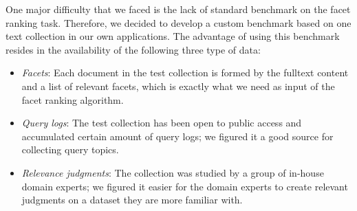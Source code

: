 
One major difficulty that we faced is the lack of standard benchmark on the
facet ranking task.  Therefore, we decided to develop a custom benchmark based
on one text collection in our own applications.  The advantage of using this
benchmark resides in the availability of the following three type of data:
\begin{itemize} \item \emph{Facets}: Each document in the test collection is
formed by the fulltext content and a list of relevant facets, which is exactly
what we need as input of the facet ranking algorithm.  \item \emph{Query logs}:
The test collection has been open to public access and accumulated certain
amount of query logs; we figured it a good source for collecting query topics.
\item \emph{Relevance judgments}: The collection was studied by a group of
in-house domain experts; we figured it easier for the domain experts to create
relevant judgments on a dataset they are more familiar with.  \end{itemize}

